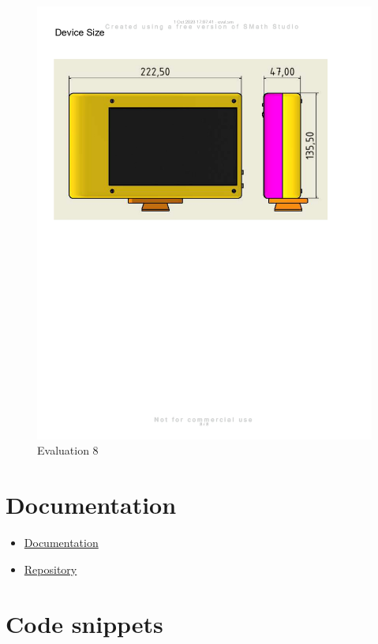\begin{figure}[H]
    \centering
    \includegraphics[width=\linewidth]{texs/appendix/data/evaluation/eval_page-0008.jpg}
    \caption{Evaluation 8}
    \label{fig:evaluation-8}
\end{figure}

\section{Documentation}
\label{appendix:documentation}

\begin{itemize}
    \item \href{https://haziqsabtu.github.io/SpeedCameraPi/}{Documentation}
    \item \href{https://github.com/HaziqSabtu/SpeedCameraPi}{Repository}
\end{itemize}

\section{Code snippets}
